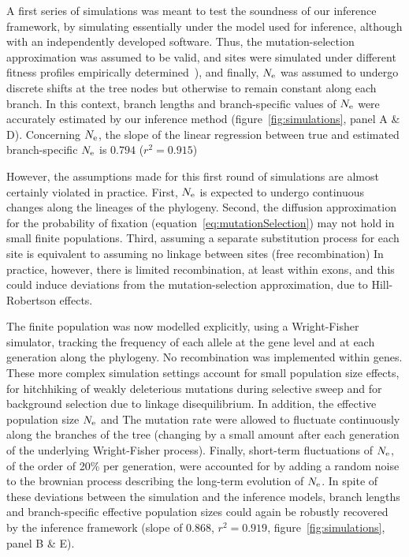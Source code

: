 A first series of simulations was meant to test the soundness of our inference framework, by simulating essentially under the model used for inference, although with an independently developed software.
Thus, the mutation-selection approximation was assumed to be valid, and sites were simulated under different fitness profiles empirically determined~\citep{Bloom2017}), and finally, $N_{\text{e}}$ was assumed to undergo discrete shifts at the tree nodes but otherwise to remain constant along each branch.
In this context, branch lengths and branch-specific values of $N_{\text{e}}$ were accurately estimated by our inference method (figure~\ref{fig:simulations}, panel A \& D).
Concerning $N_{\text{e}}$, the slope of the linear regression between true and estimated branch-specific $N_{\text{e}}$ is $0.794$ ($r^2=0.915$)

However, the assumptions made for this first round of simulations are almost certainly violated in practice.
First, $N_{\text{e}}$ is expected to undergo continuous changes along the lineages of the phylogeny.
Second, the diffusion approximation for the probability of fixation (equation~\ref{eq:mutationSelection}) may not hold in small finite populations.
Third, assuming a separate \gls{substitution} process for each site is equivalent to assuming no linkage between sites (free recombination)
In practice, however, there is limited \gls{recombination}, at least within exons, and this could induce deviations from the mutation-selection approximation, due to Hill-Robertson effects.

The finite population was now modelled explicitly, using a Wright-Fisher simulator, tracking the frequency of each \gls{allele} at the gene level and at each generation along the phylogeny.
No \gls{recombination} was implemented within genes.
These more complex simulation settings account for small population size effects, for hitchhiking of weakly deleterious mutations during selective sweep and for background selection due to linkage disequilibrium.
In addition, the \gls{effective population size} $N_{\text{e}}$ and The mutation rate were allowed to fluctuate continuously along the branches of the tree (changing by a small amount after each generation of the underlying Wright-Fisher process).
Finally, short-term fluctuations of $N_{\text{e}}$, of the order of 20\% per generation, were accounted for by adding a random noise to the brownian process describing the long-term evolution of $N_{\text{e}}$.
In spite of these deviations between the simulation and the inference models, branch lengths and branch-specific \glspl{effective population size} could again be robustly recovered by the inference framework (slope of $0.868$, $r^2=0.919$, figure~\ref{fig:simulations}, panel B \& E).

